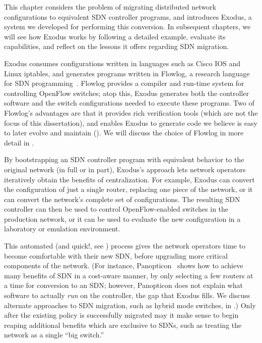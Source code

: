 
\label{sec:introduction}

This chapter considers the problem of migrating distributed network
configurations to equivalent SDN controller programs, and introduces Exodus, a
system we developed for performing this conversion.
In subsequent chapters, we will see how Exodus works by following a detailed example,
evaluate its capabilities, and reflect on the lessons it offers regarding SDN migration.

Exodus consumes configurations written
in languages such as Cisco IOS and Linux iptables, and generates programs written in Flowlog, a research
language for SDN programming~\cite{Nelson:2014flowlog}.  Flowlog
provides a compiler and run-time system for controlling OpenFlow switches;
atop this, Exodus generates both the controller software and the switch
configurations needed to execute these programs.  
Two of Flowlog's advantages are that it provides rich verification tools (which are not the
focus of this dissertation), and enables Exodus to generate code we believe is easy to
later evolve and maintain ().
We will discuss the choice of Flowlog in more detail in . 

By bootstrapping an SDN controller program with equivalent behavior to
the original network (in full or in part), Exodus's approach lets network
operators iteratively obtain the benefits of centralization.  
For example, Exodus can convert the configuration of just a single router, 
replacing one piece of the network, or it can convert the network's complete
set of configurations. The resulting SDN controller can then be used
to control OpenFlow-enabled switches in the production network,
or it can be used to evaluate the new configuration in a laboratory or
emulation environment.

This automated (and quick!, see ) process gives the network operators time to become
comfortable with their new SDN, before upgrading more critical
components of the network. (For instance, Panopticon~\cite{levin13panopticonTR} shows how
to achieve many benefits of SDN in a cost-aware manner, by only selecting
a few routers at a time for conversion to an SDN; however, Panopticon
does not explain what software to actually \emph{run} on the
controller, the gap that Exodus fills. We discuss alternate approaches to
SDN migration, such as hybrid mode switches, in .)  Only
after the existing policy is successfully migrated may it make sense
to begin reaping additional benefits which are exclusive to SDNs, such
as treating the network as a single ``big switch.''

